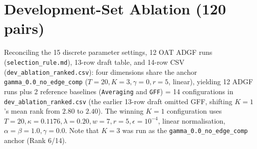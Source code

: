 \documentclass[conference]{IEEEtran}
\begin{document}
\section{Development-Set Ablation (120 pairs)}
Reconciling the 15 discrete parameter settings, 12 OAT ADGF runs (\texttt{selection\_rule.md}), 13-row draft table, and 14-row CSV (\texttt{dev\_ablation\_ranked.csv}): four dimensions share the anchor \texttt{gamma\_0.0\_no\_edge\_comp} ($T=20, K=3, \gamma=0, r=5$, linear), yielding 12 ADGF runs plus 2 reference baselines (\texttt{Averaging} and \texttt{GFF}) = 14 configurations in \texttt{dev\_ablation\_ranked.csv} (the earlier 13-row draft omitted GFF, shifting $K=1$'s mean rank from $2.80$ to $2.40$). The winning $K=1$ configuration uses $T=20, \kappa=0.1176, \lambda=0.20, w=7, r=5, \epsilon=10^{-4}$, linear normalisation, $\alpha=\beta=1.0, \gamma=0.0$. Note that $K=3$ was run as the \texttt{gamma\_0.0\_no\_edge\_comp} anchor (Rank 6/14).
\end{document}
